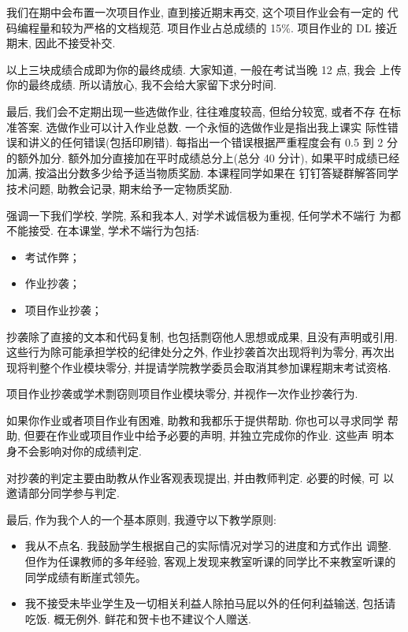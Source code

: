\documentclass[a4paper]{ctexart}
\begin{document}
我们在期中会布置一次项目作业, 直到接近期末再交, 这个项目作业会有一定的
代码编程量和较为严格的文档规范. 项目作业占总成绩的 15\%. 项目作业的 DL
接近期末, 因此不接受补交. 

以上三块成绩合成即为你的最终成绩. 大家知道, 一般在考试当晚 12 点, 我会
上传你的最终成绩. 所以请放心, 我不会给大家留下求分时间.

最后, 我们会不定期出现一些选做作业, 往往难度较高, 但给分较宽, 或者不存
在标准答案. 选做作业可以计入作业总数. 一个永恒的选做作业是指出我上课实
际性错误和讲义的任何错误(包括印刷错). 每指出一个错误根据严重程度会有
0.5 到 2 分的额外加分. 额外加分直接加在平时成绩总分上(总分 40 分计),
如果平时成绩已经加满, 按溢出分数多少给予适当物质奖励. 本课程同学如果在
钉钉答疑群解答同学技术问题, 助教会记录, 期末给予一定物质奖励.

强调一下我们学校, 学院, 系和我本人, 对学术诚信极为重视, 任何学术不端行
为都不能接受. 在本课堂, 学术不端行为包括:

\begin{itemize}
\item 考试作弊；
\item 作业抄袭；
\item 项目作业抄袭；
\end{itemize}

抄袭除了直接的文本和代码复制, 也包括剽窃他人思想或成果, 
且没有声明或引用. 这些行为除可能承担学校的纪律处分之外, 
作业抄袭首次出现将判为零分, 再次出现将判整个作业模块零分, 
并提请学院教学委员会取消其参加课程期末考试资格.

项目作业抄袭或学术剽窃则项目作业模块零分, 并视作一次作业抄袭行为.

如果你作业或者项目作业有困难, 助教和我都乐于提供帮助. 你也可以寻求同学
帮助, 但要在作业或项目作业中给予必要的声明, 并独立完成你的作业. 这些声
明本身不会影响对你的成绩判定.

对抄袭的判定主要由助教从作业客观表现提出, 并由教师判定. 必要的时候, 可
以邀请部分同学参与判定. %

最后, 作为我个人的一个基本原则, 我遵守以下教学原则:

\begin{itemize}
  \item 我从不点名. 我鼓励学生根据自己的实际情况对学习的进度和方式作出
    调整. 但作为任课教师的多年经验, 客观上发现来教室听课的同学比不来教室听课的同学成绩有断崖式领先。
  \item 我不接受未毕业学生及一切相关利益人除拍马屁以外的任何利益输送,
    包括请吃饭. 概无例外. 鲜花和贺卡也不建议个人赠送.  
\end{itemize}
\end{document}
